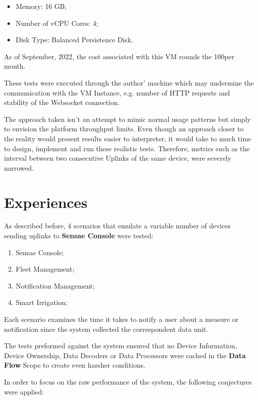 \begin{itemize}
    \item Memory: 16 GB;
    \item Number of vCPU Cores: 4;
    \item Disk Type: Balanced Persistence Disk.
\end{itemize}

As of September, 2022, the cost associated with this \gls{VM} rounds the 100\texteuro per month.

These tests were executed through the author' machine which may undermine the communication with the \gls{VM} Instance, e.g. number of HTTP requests and stability of the Websocket connection.

The approach taken isn't an attempt to mimic normal usage patterns but simply to envision the platform throughput limits. Even though an approach closer to the reality would present results easier to interpreter, it would take to much time to design, implement and run these realistic tests. Therefore, metrics such as the interval between two consecutive Uplinks of the same device, were severely narrowed.

\section{Experiences}
\label{sec:evaluation:experiences}

As described before, 4 scenarios that emulate a variable number of devices sending uplinks to \textbf{Sensae Console} were tested:

\begin{enumerate}
    \item Sensae Console;
    \item Fleet Management;
    \item Notification Management;
    \item Smart Irrigation;
\end{enumerate}

Each scenario examines the time it takes to notify a user about a measure or notification since the system collected the correspondent data unit.

The tests preformed against the system ensured that no Device Information, Device Ownership, Data Decoders or Data Processors were cached in the \textbf{Data Flow} Scope to create even harsher conditions.

In order to focus on the raw performance of the system, the following conjectures were applied:

